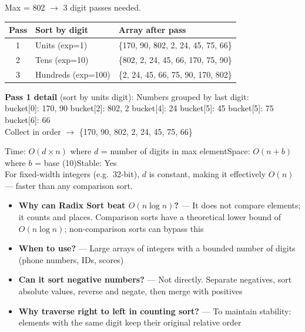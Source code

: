 \documentclass[12pt,a4paper,oneside]{book}
\begin{document}
\begin{dryrun}[Dry Run: arr = \{170, 45, 75, 90, 802, 24, 2, 66\}]
Max = 802 $\to$ 3 digit passes needed.

\begin{center}
\begin{tabular}{cll}
\toprule
\textbf{Pass} & \textbf{Sort by digit} & \textbf{Array after pass}\\
\midrule
1 & Units (exp=1) & \{170, 90, 802, 2, 24, 45, 75, 66\}\\
2 & Tens (exp=10) & \{802, 2, 24, 45, 66, 170, 75, 90\}\\
3 & Hundreds (exp=100) & \{2, 24, 45, 66, 75, 90, 170, 802\}\\
\bottomrule
\end{tabular}
\end{center}

\textbf{Pass 1 detail} (sort by units digit):
Numbers grouped by last digit:\\
bucket[0]: 170, 90 \quad bucket[2]: 802, 2 \quad bucket[4]: 24 \quad bucket[5]: 45 \quad bucket[5]: 75 \quad bucket[6]: 66\\
Collect in order $\to$ \{170, 90, 802, 2, 24, 45, 75, 66\}
\end{dryrun}

\begin{complexity}
Time: $O(d \times n)$ where $d$ = number of digits in max element\quad Space: $O(n + b)$ where $b$ = base (10)\quad Stable: Yes\\[4pt]
For fixed-width integers (e.g.\ 32-bit), $d$ is constant, making it effectively $O(n)$ --- faster than any comparison sort.
\end{complexity}

\begin{interviewcorner}
\begin{itemize}
  \item \textbf{Why can Radix Sort beat $O(n \log n)$?} --- It does not compare elements; it counts and places. Comparison sorts have a theoretical lower bound of $O(n \log n)$; non-comparison sorts can bypass this
  \item \textbf{When to use?} --- Large arrays of integers with a bounded number of digits (phone numbers, IDs, scores)
  \item \textbf{Can it sort negative numbers?} --- Not directly. Separate negatives, sort absolute values, reverse and negate, then merge with positives
  \item \textbf{Why traverse right to left in counting sort?} --- To maintain stability: elements with the same digit keep their original relative order
\end{itemize}
\end{interviewcorner}
\end{document}
